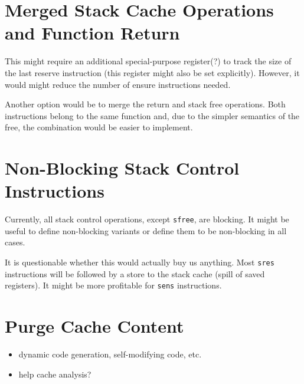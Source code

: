 \documentclass[a4paper,fontsize=10pt,twoside,DIV15,BCOR12mm,headinclude=true,footinclude=false,pagesize,bibtotoc]{scrbook}
\newcommand{\comment}[3]{

\textsf{\textbf{#1}} {\color{#3}#2}}
\newcommand{\martin}[1]{\comment{Martin}{#1}{Blue}}
\newcommand{\stefan}[1]{\comment{Stefan}{#1}{RoyalPurple}}
\renewcommand{\martin}[1]{}
\renewcommand{\stefan}[1]{}
\begin{document}
\section{Merged Stack Cache Operations and Function Return}

This might require an additional special-purpose register(?) to track the size
of the last reserve instruction (this register might also be set explicitly).
However, it would might reduce the number of ensure instructions needed.

Another option would be to merge the return and stack free operations. Both
instructions belong to the same function and, due to the simpler semantics of
the free, the combination would be easier to implement.

\stefan{I doubt that merging those functions would actually gain something. It reduces the flexibility for the compiler to perform ensure
only where needed, may limit the possibilities for passing data over the stack cache, and requires additional
code to restore the special registers that are required to track the size of the stack. Only gain I see is when the word in front of the
method code that stores the size of the method is used to store the stack size as 16bit value, and limit the size of the method to a 16bit
value. Then no additional data needs to be transferred. The stack control instructions would still be required to allow the compiler to
allocate stack e.g. only in certain contexts.}

\martin{If stack operations only happens at function call
and return this merge would make sense. It makes also
very clear that M$ memory access and S$ memory access are coordinated.}

\section{Non-Blocking Stack Control Instructions}

Currently, all stack control operations, except \texttt{sfree}, are blocking. It
might be useful to define non-blocking variants or define them to be
non-blocking in all cases.

It is questionable whether this would actually buy us anything. Most
\texttt{sres} instructions will be followed by a store to the stack cache
(spill of saved registers). It might be more profitable for \texttt{sens}
instructions.

\section{Purge Cache Content}
\begin{itemize}
  \item dynamic code generation, self-modifying code, etc.
  \item help cache analysis?
\end{itemize}
\end{document}
